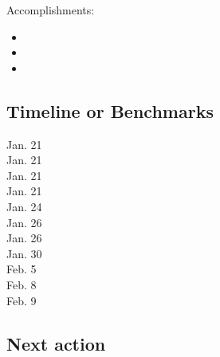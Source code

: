 \documentclass[10pt,letterpaper]{article}
\newcommand{\bi}{\begin{itemize}}
\newcommand{\ei}{\end{itemize}}
\begin{document}
Accomplishments:
\bi
\item 
\item
\item
\ei

\subsection{Timeline or Benchmarks}
\label{sub:benchmarks}



\begin{description}
\item [Jan. 21]
\item [Jan. 21]
\item [Jan. 21] 
\item [Jan. 21] 
\item [Jan. 24] 
\item [Jan. 26]
\item [Jan. 26]
\item [Jan. 30] 
\item [Feb. 5] 
\item [Feb. 8]
\item [Feb. 9]
\end{description}

\subsection{Next action}
\label{sub:next}


\end{document}
